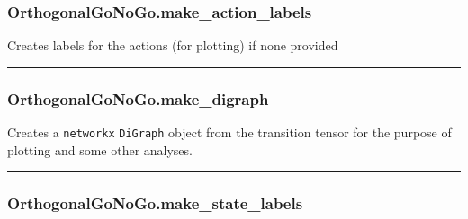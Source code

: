 \hypertarget{orthogonalgonogo.make_action_labels}{%
\subsubsection{OrthogonalGoNoGo.make\_action\_labels}\label{orthogonalgonogo.make_action_labels}}

\begin{Shaded}
\begin{Highlighting}[]
\NormalTok{)}
\end{Highlighting}
\end{Shaded}

Creates labels for the actions (for plotting) if none provided

\begin{center}\rule{0.5\linewidth}{\linethickness}\end{center}

\hypertarget{orthogonalgonogo.make_digraph}{%
\subsubsection{OrthogonalGoNoGo.make\_digraph}\label{orthogonalgonogo.make_digraph}}

\begin{Shaded}
\begin{Highlighting}[]
\NormalTok{)}
\end{Highlighting}
\end{Shaded}

Creates a \texttt{networkx} \texttt{DiGraph} object from the transition
tensor for the purpose of plotting and some other analyses.

\begin{center}\rule{0.5\linewidth}{\linethickness}\end{center}

\hypertarget{orthogonalgonogo.make_state_labels}{%
\subsubsection{OrthogonalGoNoGo.make\_state\_labels}\label{orthogonalgonogo.make_state_labels}}

\begin{Shaded}
\begin{Highlighting}[]
\NormalTok{)}
\end{Highlighting}
\end{Shaded}

